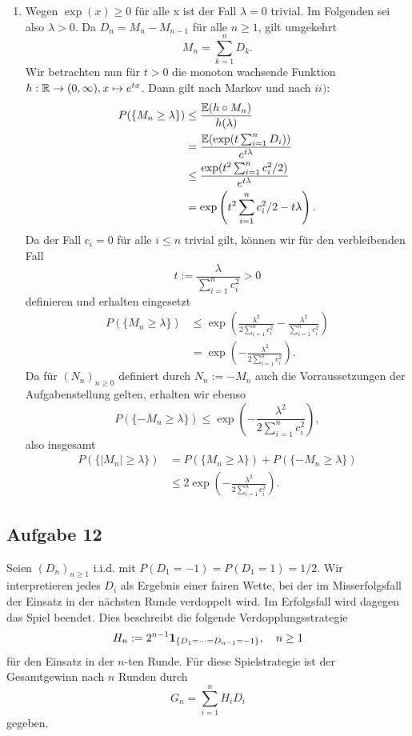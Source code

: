 \documentclass[12pt]{scrartcl}
\begin{document}
\begin{enumerate}[$i)$,wide]
\item Wegen $\exp(x)\ge 0$ für alle x ist der Fall $\lambda=0$ trivial. Im Folgenden sei also $\lambda>0$. Da $D_n=M_n-M_{n-1}$ für alle $n\ge 1$, gilt umgekehrt
$$M_n=\sum_{k=1}^n D_k.$$
Wir betrachten nun für $t>0$ die monoton wachsende Funktion $h: \mathbb{R}\rightarrow(0,\infty), x\mapsto e^{tx}$. Dann gilt nach Markov und nach $ii)$:
\begin{align*}
P(\{M_n\ge \lambda\})
&\le \frac{\mathbb{E}(h\circ M_n)}{h(\lambda)} \\
&= \frac{\mathbb{E}(\exp(t\sum_{i=1}^n D_i))}{e^{t\lambda}} \\
&\le \frac{\exp(t^2\sum_{i=1}^n c_i^2/2)}{e^{t\lambda}} \\
&= \exp\left(t^2\sum_{i=1}^n c_i^2/2-t\lambda\right).
\end{align*}
Da der Fall $c_i=0$ für alle $i\le n$ trivial gilt, können wir für den verbleibenden Fall
$$t:=\frac{\lambda}{\sum_{i=1}^n c_i^2}>0$$
definieren und erhalten eingesetzt
\begin{align*}
P(\{M_n\ge \lambda\})
&\le \exp\left(\frac{\lambda^2}{2\sum_{i=1}^n c_i^2}-\frac{\lambda^2}{\sum_{i=1}^n c_i^2}\right) \\
&= \exp\left(-\frac{\lambda^2}{2\sum_{i=1}^n c_i^2}\right).
\end{align*}
Da für $(N_n)_{n\ge 0}$ definiert durch $N_n:=-M_n$ auch die Vorraussetzungen der Aufgabenstellung gelten, erhalten wir ebenso 
$$P(\{-M_n\ge \lambda\}) \le \exp\left(-\frac{\lambda^2}{2\sum_{i=1}^n c_i^2}\right),$$
also insgesamt
\begin{align*}
P(\{|M_n|\ge \lambda\})
&= P(\{M_n\ge \lambda\})+P(\{-M_n\ge \lambda\}) \\
&\le 2\exp\left(-\frac{\lambda^2}{2\sum_{i=1}^n c_i^2}\right).
\end{align*}

\end{enumerate}

\ausruecken
\subsection*{Aufgabe 12}

Seien $(D_n)_{n\ge 1}$ i.i.d. mit $P(D_1=-1)=P(D_1=1)=1/2$. Wir interpretieren jedes $D_i$ als Ergebnis einer fairen Wette, bei der im Misserfolgsfall der Einsatz in der nächsten Runde verdoppelt wird. Im Erfolgsfall wird dagegen das Spiel beendet. Dies beschreibt die folgende Verdopplungsstrategie
$$H_n:=2^{n-1}\textbf{1}_{\{D_1=\dots=D_{n-1}=-1\}}, \quad n\ge 1$$
für den Einsatz in der $n$-ten Runde. Für diese Spielstrategie ist der Gesamtgewinn nach $n$ Runden durch
$$G_n=\sum_{i=1}^n H_iD_i$$
gegeben.
\end{document}
